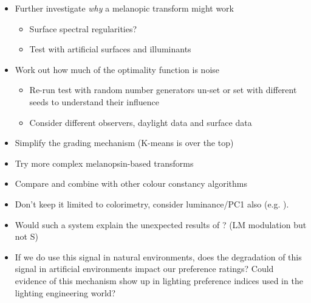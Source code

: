 \begin{itemize}
\item Further investigate \emph{why} a melanopic transform might work
\begin{itemize}
\item Surface spectral regularities?
\item Test with artificial surfaces and illuminants
\end{itemize}
\item Work out how much of the optimality function is noise
\begin{itemize}
\item Re-run test with random number generators un-set or set with different seeds to understand their influence
\item Consider different observers, daylight data and surface data
\end{itemize}
\item Simplify the grading mechanism (K-means is over the top)
\item Try more complex melanopsin-based transforms
\item Compare and combine with other colour constancy algorithms
\item Don't keep it limited to colorimetry, consider luminance/PC1 also (e.g. \citet{chakrabarti_color_2015}). 
\item Would such a system explain the unexpected results of \citet{cao_evidence_2018}? (LM modulation but not S)
\item If we do use this signal in natural environments, does the degradation of this signal in artificial environments impact our preference ratings? Could evidence of this mechanism show up in lighting preference indices used in the lighting engineering world?
\end{itemize}



